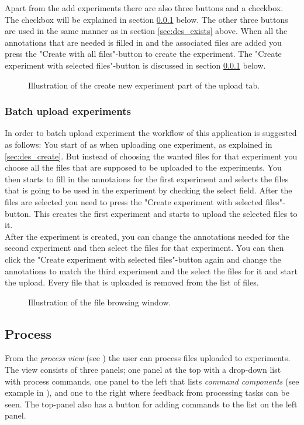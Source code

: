  Apart from the add experiments there are also three buttons and a checkbox. The checkbox will be explained in section \ref{sec:des_batch} below. The other three buttons are used in the same manner as in section \ref{sec:des_exists} above. When all the annotations that are needed is filled in and the associated files are added you press the "Create with all files"-button to create the experiment. The "Create experiment with selected files"-button is discussed in section \ref{sec:des_batch} below. \\

\begin{figure}[h]
	\caption{Illustration of the create new experiment part of the upload tab.}
	\label{fig:des_upload-new}
\end{figure}
\subsubsection{Batch upload experiments}
\label{sec:des_batch}
In order to batch upload experiment the workflow of this application is suggested as follows:
You start of as when uploading one experiment, as explained in \ref{sec:des_create}. But instead of choosing the wanted files for that experiment you choose all the files that are supposed to be uploaded to the experiments. You then starts to fill in the annotaions for the first experiment and selects the files that is going to be used in the experiment by checking the select field. After the files are selected you need to press the "Create experiment with selected files"-button. This creates the first experiment and starts to upload the selected files to it. \\

After the experiment is created, you can change the annotations needed for the second experiment and then select the files for that experiment. You can then click the "Create experiment with selected files"-button again and change the annotations to match the third experiment and the select the files for it and start the upload. Every file that is uploaded is removed from the list of files. 

\begin{figure}[h]
	\caption{Illustration of the file browsing window.}
	\label{fig:des_upload}
\end{figure}
\FloatBarrier


\subsection{Process}
From the \textit{process view} (see ) the user can process files uploaded to experiments. The view consists of three panels; one panel at the top with a drop-down list with process commands, one panel to the left that lists \textit{command components} (see example in ), and one to the right where feedback from processing tasks can be seen. The top-panel also has a button for adding commands to the list on the left panel.

